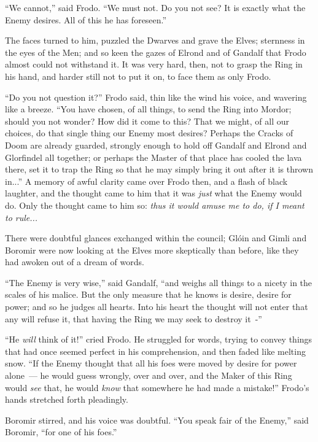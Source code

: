 ``We cannot,'' said Frodo. ``We must not. Do you not see? It is exactly what the Enemy desires. All of this he has foreseen.''

The faces turned to him, puzzled the Dwarves and grave the Elves; sternness in the eyes of the Men; and so keen the gazes of Elrond and of Gandalf that Frodo almost could not withstand it. It was very hard, then, not to grasp the Ring in his hand, and harder still not to put it on, to face them as only Frodo.

``Do you not question it?'' Frodo said, thin like the wind his voice, and wavering like a breeze. ``You have chosen, of all things, to send the Ring into Mordor; should you not wonder? How did it come to this? That we might, of all our choices, do that single thing our Enemy most desires? Perhaps the Cracks of Doom are already guarded, strongly enough to hold off Gandalf and Elrond and Glorfindel all together; or perhaps the Master of that place has cooled the lava there, set it to trap the Ring so that he may simply bring it out after it is thrown in...'' A memory of awful clarity came over Frodo then, and a flash of black laughter, and the thought came to him that it was \emph{just} what the Enemy would do. Only the thought came to him so: \emph{thus it would amuse me to do, if I meant to rule...}

There were doubtful glances exchanged within the council; Glóin and Gimli and Boromir were now looking at the Elves more skeptically than before, like they had awoken out of a dream of words.

``The Enemy is very wise,'' said Gandalf, ``and weighs all things to a nicety in the scales of his malice. But the only measure that he knows is desire, desire for power; and so he judges all hearts. Into his heart the thought will not enter that any will refuse it, that having the Ring we may seek to destroy it~-''

``He \emph{will} think of it!'' cried Frodo. He struggled for words, trying to convey things that had once seemed perfect in his comprehension, and then faded like melting snow. ``If the Enemy thought that all his foes were moved by desire for power alone~--- he would guess wrongly, over and over, and the Maker of this Ring would \emph{see} that, he would \emph{know} that somewhere he had made a mistake!'' Frodo's hands stretched forth pleadingly.

Boromir stirred, and his voice was doubtful. ``You speak fair of the Enemy,'' said Boromir, ``for one of his foes.''

